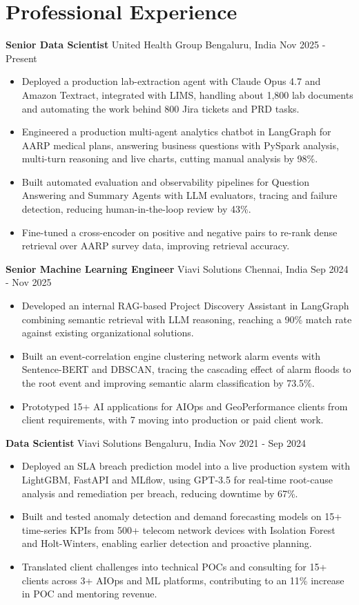 \documentclass[10pt,a4paper]{article}
\newcommand{\role}[4]{\textbf{#1} \textbar{} #2 \hfill #3 \textbar{} #4\par}
\begin{document}
\section{Professional Experience}
\role{Senior Data Scientist}{United Health Group}{Bengaluru, India}{Nov 2025 - Present}
\begin{itemize}
  \item Deployed a production lab-extraction agent with Claude Opus 4.7 and Amazon Textract, integrated with LIMS, handling about 1,800 lab documents and automating the work behind 800 Jira tickets and PRD tasks.
  \item Engineered a production multi-agent analytics chatbot in LangGraph for AARP medical plans, answering business questions with PySpark analysis, multi-turn reasoning and live charts, cutting manual analysis by 98\%.
  \item Built automated evaluation and observability pipelines for Question Answering and Summary Agents with LLM evaluators, tracing and failure detection, reducing human-in-the-loop review by 43\%.
  \item Fine-tuned a cross-encoder on positive and negative pairs to re-rank dense retrieval over AARP survey data, improving retrieval accuracy.
\end{itemize}
\vspace{3pt}
\role{Senior Machine Learning Engineer}{Viavi Solutions}{Chennai, India}{Sep 2024 - Nov 2025}
\begin{itemize}
  \item Developed an internal RAG-based Project Discovery Assistant in LangGraph combining semantic retrieval with LLM reasoning, reaching a 90\% match rate against existing organizational solutions.
  \item Built an event-correlation engine clustering network alarm events with Sentence-BERT and DBSCAN, tracing the cascading effect of alarm floods to the root event and improving semantic alarm classification by 73.5\%.
  \item Prototyped 15+ AI applications for AIOps and GeoPerformance clients from client requirements, with 7 moving into production or paid client work.
\end{itemize}
\vspace{3pt}
\role{Data Scientist}{Viavi Solutions}{Bengaluru, India}{Nov 2021 - Sep 2024}
\begin{itemize}
  \item Deployed an SLA breach prediction model into a live production system with LightGBM, FastAPI and MLflow, using GPT-3.5 for real-time root-cause analysis and remediation per breach, reducing downtime by 67\%.
  \item Built and tested anomaly detection and demand forecasting models on 15+ time-series KPIs from 500+ telecom network devices with Isolation Forest and Holt-Winters, enabling earlier detection and proactive planning.
  \item Translated client challenges into technical POCs and consulting for 15+ clients across 3+ AIOps and ML platforms, contributing to an 11\% increase in POC and mentoring revenue.
\end{itemize}
\end{document}
